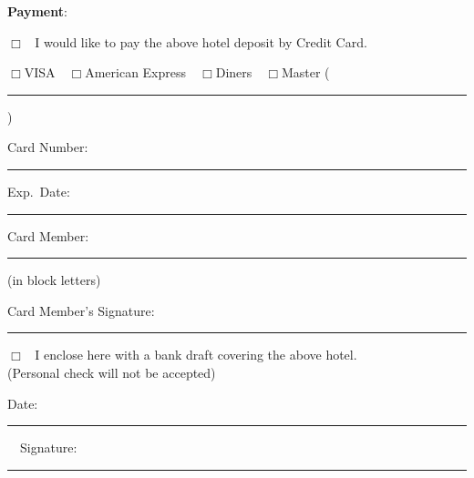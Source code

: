 {\bf Payment}:

$\Box$ \ I would like to pay the above hotel deposit by Credit Card.

\hspace*{10mm}
$\Box$VISA\ \ $\Box$American Express\ \ $\Box$Diners\ \ $\Box$Master
(\rule[-1mm]{40mm}{.1mm})

\hspace*{10mm}
Card Number: \rule[-1mm]{60mm}{.1mm} Exp.\ Date: \rule[-1mm]{40mm}{.1mm} 

\hspace*{10mm}
Card Member: \rule[-1mm]{60mm}{.1mm} (in block letters)

\hspace*{10mm}
Card Member's Signature: \rule[-1mm]{60mm}{.1mm}

$\Box$ \ I enclose here with a bank draft covering the above hotel.\\
\hspace*{20mm}(Personal check will not be accepted)

\vspace{5mm}
Date: \rule[-1mm]{60mm}{.1mm}\ \  Signature: \rule[-1mm]{60mm}{.1mm}




